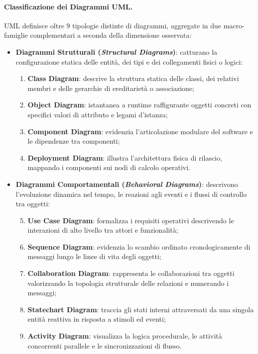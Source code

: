 \documentclass[12pt]{extarticle}
\begin{document}
\paragraph{Classificazione dei Diagrammi UML.}
UML definisce oltre 9 tipologie distinte di diagrammi, aggregate in due macro-famiglie complementari a seconda della dimensione osservata:
\begin{itemize}
    \item \textbf{Diagrammi Strutturali (\textit{Structural Diagrams})}: catturano la configurazione statica delle entità, dei tipi e dei collegamenti fisici o logici:
    \begin{enumerate}
        \item \textbf{Class Diagram}: descrive la struttura statica delle classi, dei relativi membri e delle gerarchie di ereditarietà o associazione;
        \item \textbf{Object Diagram}: istantanea a runtime raffigurante oggetti concreti con specifici valori di attributo e legami d'istanza;
        \item \textbf{Component Diagram}: evidenzia l'articolazione modulare del software e le dipendenze tra componenti;
        \item \textbf{Deployment Diagram}: illustra l'architettura fisica di rilascio, mappando i componenti sui nodi di calcolo operativi.
    \end{enumerate}
    \item \textbf{Diagrammi Comportamentali (\textit{Behavioral Diagrams})}: descrivono l'evoluzione dinamica nel tempo, le reazioni agli eventi e i flussi di controllo tra oggetti:
    \begin{enumerate}
        \setcounter{enumi}{4}
        \item \textbf{Use Case Diagram}: formalizza i requisiti operativi descrivendo le interazioni di alto livello tra attori e funzionalità;
        \item \textbf{Sequence Diagram}: evidenzia lo scambio ordinato cronologicamente di messaggi lungo le linee di vita degli oggetti;
        \item \textbf{Collaboration Diagram}: rappresenta le collaborazioni tra oggetti valorizzando la topologia strutturale delle relazioni e numerando i messaggi;
        \item \textbf{Statechart Diagram}: traccia gli stati interni attraversati da una singola entità reattiva in risposta a stimoli ed eventi;
        \item \textbf{Activity Diagram}: visualizza la logica procedurale, le attività concorrenti parallele e le sincronizzazioni di flusso.
    \end{enumerate}
\end{itemize}
\end{document}
